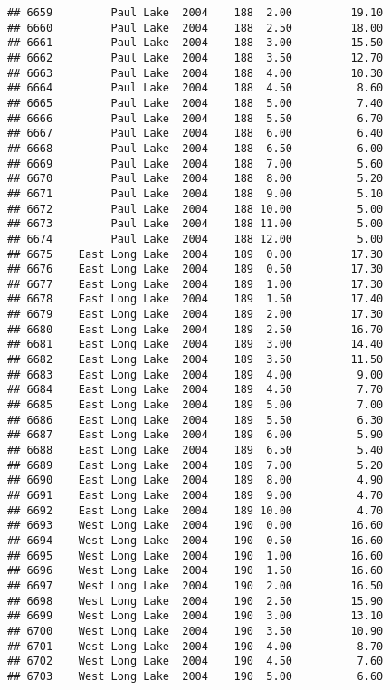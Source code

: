 \documentclass[
]{article}
\begin{document}
\begin{verbatim}
## 6659         Paul Lake  2004    188  2.00         19.10
## 6660         Paul Lake  2004    188  2.50         18.00
## 6661         Paul Lake  2004    188  3.00         15.50
## 6662         Paul Lake  2004    188  3.50         12.70
## 6663         Paul Lake  2004    188  4.00         10.30
## 6664         Paul Lake  2004    188  4.50          8.60
## 6665         Paul Lake  2004    188  5.00          7.40
## 6666         Paul Lake  2004    188  5.50          6.70
## 6667         Paul Lake  2004    188  6.00          6.40
## 6668         Paul Lake  2004    188  6.50          6.00
## 6669         Paul Lake  2004    188  7.00          5.60
## 6670         Paul Lake  2004    188  8.00          5.20
## 6671         Paul Lake  2004    188  9.00          5.10
## 6672         Paul Lake  2004    188 10.00          5.00
## 6673         Paul Lake  2004    188 11.00          5.00
## 6674         Paul Lake  2004    188 12.00          5.00
## 6675    East Long Lake  2004    189  0.00         17.30
## 6676    East Long Lake  2004    189  0.50         17.30
## 6677    East Long Lake  2004    189  1.00         17.30
## 6678    East Long Lake  2004    189  1.50         17.40
## 6679    East Long Lake  2004    189  2.00         17.30
## 6680    East Long Lake  2004    189  2.50         16.70
## 6681    East Long Lake  2004    189  3.00         14.40
## 6682    East Long Lake  2004    189  3.50         11.50
## 6683    East Long Lake  2004    189  4.00          9.00
## 6684    East Long Lake  2004    189  4.50          7.70
## 6685    East Long Lake  2004    189  5.00          7.00
## 6686    East Long Lake  2004    189  5.50          6.30
## 6687    East Long Lake  2004    189  6.00          5.90
## 6688    East Long Lake  2004    189  6.50          5.40
## 6689    East Long Lake  2004    189  7.00          5.20
## 6690    East Long Lake  2004    189  8.00          4.90
## 6691    East Long Lake  2004    189  9.00          4.70
## 6692    East Long Lake  2004    189 10.00          4.70
## 6693    West Long Lake  2004    190  0.00         16.60
## 6694    West Long Lake  2004    190  0.50         16.60
## 6695    West Long Lake  2004    190  1.00         16.60
## 6696    West Long Lake  2004    190  1.50         16.60
## 6697    West Long Lake  2004    190  2.00         16.50
## 6698    West Long Lake  2004    190  2.50         15.90
## 6699    West Long Lake  2004    190  3.00         13.10
## 6700    West Long Lake  2004    190  3.50         10.90
## 6701    West Long Lake  2004    190  4.00          8.70
## 6702    West Long Lake  2004    190  4.50          7.60
## 6703    West Long Lake  2004    190  5.00          6.60

\end{verbatim}
\end{document}
